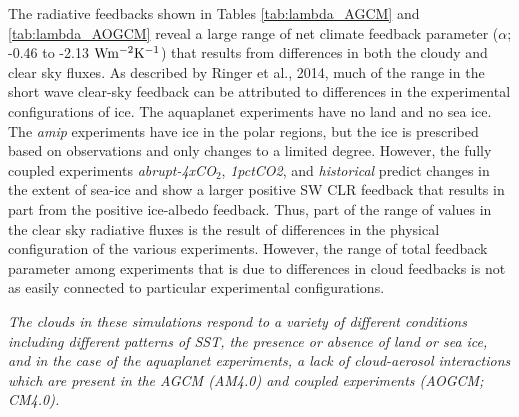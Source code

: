 \documentclass[draft]{agujournal2019}
\begin{document}
The radiative feedbacks shown in Tables \ref{tab:lambda_AGCM} and \ref{tab:lambda_AOGCM} reveal a large range of 
net climate feedback parameter ($\alpha$; -0.46 to -2.13 $\rm{W m^{-2}K^{-1}}$) that results from differences in both the 
cloudy and clear sky fluxes.   
%
As described by Ringer et al., 2014, much of the range in the short wave clear-sky feedback can be attributed to differences 
in the experimental configurations of ice.  The aquaplanet experiments have no land and no sea ice.  
The \textit{amip} experiments have ice in the polar regions, but the ice is prescribed based on observations and 
only changes to a limited degree.  However, the fully coupled experiments \textit{abrupt-4xCO$_2$}, 
\textit{1pctCO2}, and \textit{historical} predict changes in the extent of sea-ice and show a larger positive SW CLR
feedback that results in part from the positive ice-albedo feedback.  
Thus, part of the range of values in the clear sky radiative fluxes is the result of differences in the physical configuration 
of the various experiments.  
However, the range of total feedback parameter among experiments that is due to differences in cloud feedbacks is not as easily connected to particular experimental configurations.  

\textit{The clouds in these simulations respond to a variety of different conditions including different
patterns of SST, the presence or absence of land or sea ice, and in the case of the aquaplanet
experiments, a lack of cloud-aerosol interactions which are present in the AGCM (AM4.0) and coupled 
experiments (AOGCM; CM4.0).  } 

\end{document}
